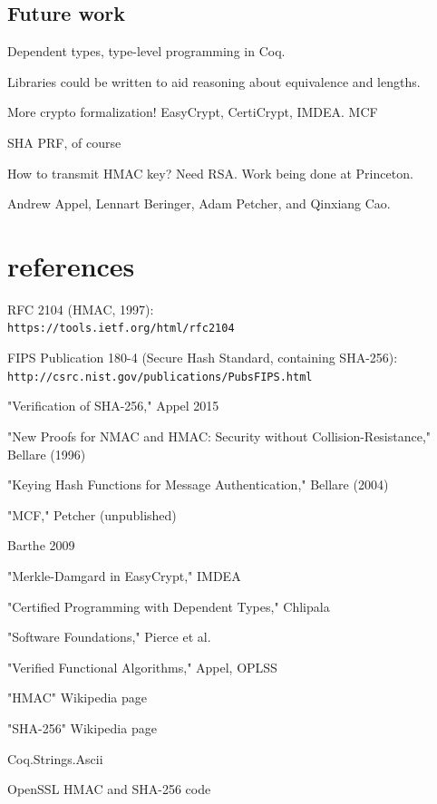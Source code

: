 \documentclass[twocolumn,showpacs,%
  nofootinbib,aps,superscriptaddress,%
  eqsecnum,prd,notitlepage,showkeys,10pt]{revtex4-1}
\begin{document}
\subsection{Future work}

Dependent types, type-level programming in Coq.

Libraries could be written to aid reasoning about equivalence and lengths.

More crypto formalization! EasyCrypt, CertiCrypt, IMDEA. MCF

SHA PRF, of course

How to transmit HMAC key? Need RSA. Work being done at Princeton.


\begin{acknowledgments}

Andrew Appel, Lennart Beringer, Adam Petcher, and Qinxiang Cao.

\end{acknowledgments}

\section{references}

RFC 2104 (HMAC, 1997): \\
\verb|https://tools.ietf.org/html/rfc2104|

FIPS Publication 180-4 (Secure Hash Standard, containing SHA-256): \\
\verb|http://csrc.nist.gov/publications/PubsFIPS.html|

"Verification of SHA-256," Appel 2015

"New Proofs for NMAC and HMAC: Security without Collision-Resistance," Bellare (1996)

"Keying Hash Functions for Message Authentication," Bellare (2004)

"MCF," Petcher (unpublished)

Barthe 2009

"Merkle-Damgard in EasyCrypt," IMDEA

"Certified Programming with Dependent Types," Chlipala

"Software Foundations," Pierce et al.

"Verified Functional Algorithms," Appel, OPLSS

"HMAC" Wikipedia page

"SHA-256" Wikipedia page

Coq.Strings.Ascii

OpenSSL HMAC and SHA-256 code
\end{document}
